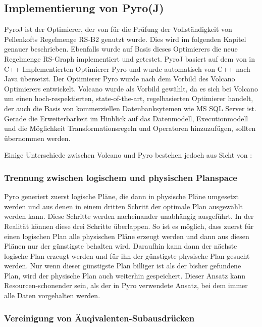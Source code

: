 \subsection{Implementierung von Pyro(J)}
\label{sec:pyroJ}
PyroJ ist der Optimierer, der von \cite{shanbhag2014optimizing} für die Prüfung der Vollständigkeit von Pellenkofts Regelmenge RS-B2 genutzt wurde. Dies wird im folgenden Kapitel genauer beschrieben. Ebenfalls wurde auf Basis dieses Optimierers die neue Regelmenge RS-Graph implementiert und getestet. 
PyroJ basiert auf dem von \cite{roy2001multi} in C++ Implementierten Optimierer Pyro und wurde automatisch von C++ nach Java übersetzt. Der Optimierer Pyro wurde nach dem Vorbild des Volcano Optimierers entwickelt. Volcano wurde als Vorbild gewählt, da es sich bei Volcano um einen hoch-respektierten, state-of-the-art, regelbasierten Optimierer handelt, der auch die Basis von kommerziellen Datenbanksytemen wie MS SQL Server ist. Gerade die Erweiterbarkeit im Hinblick auf das Datenmodell, Executionmodell und die Möglichkeit Transformationsregeln und Operatoren hinzuzufügen, sollten übernommen werden.


Einige Unterschiede zwischen Volcano und Pyro bestehen jedoch aus Sicht von \cite{roy2001multi}:

\subsubsection{Trennung zwischen logischem und physischen Planspace}

Pyro generiert zuerst logische Pläne, die dann in physische Pläne umgesetzt werden und aus denen in einem dritten Schritt der optimale Plan ausgewählt werden kann. Diese Schritte werden nacheinander unabhängig ausgeführt. In der Realität können diese drei Schritte überlappen. So ist es möglich, dass zuerst für einen logischen Plan alle physischen Pläne erzeugt werden und dann aus diesen Plänen nur der günstigste behalten wird. Daraufhin kann dann der nächste logische Plan erzeugt werden und für ihn der günstigste physische Plan gesucht werden. Nur wenn dieser günstigste Plan billiger ist als der bisher gefundene Plan, wird der physische Plan auch weiterhin gespeichert. Dieser Ansatz kann Resourcen-schonender sein, als der in Pyro verwendete Ansatz, bei dem immer alle Daten vorgehalten werden. 

\subsubsection{Vereinigung von Äuqivalenten-Subausdrücken}

